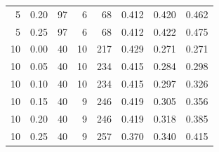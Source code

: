 \begin{longtable}{@{}rrrrrrrr@{}}
5 & 0.20 & 97 & 6 & 68 & 0.412 & 0.420 & 0.462\\
5 & 0.25 & 97 & 6 & 68 & 0.412 & 0.422 & 0.475\\
10 & 0.00 & 40 & 10 & 217 & 0.429 & 0.271 & 0.271\\
10 & 0.05 & 40 & 10 & 234 & 0.415 & 0.284 & 0.298\\
10 & 0.10 & 40 & 10 & 234 & 0.415 & 0.297 & 0.326\\
10 & 0.15 & 40 & 9 & 246 & 0.419 & 0.305 & 0.356\\
10 & 0.20 & 40 & 9 & 246 & 0.419 & 0.318 & 0.385\\
10 & 0.25 & 40 & 9 & 257 & 0.370 & 0.340 & 0.415\\
\bottomrule
\end{longtable}
\endgroup
